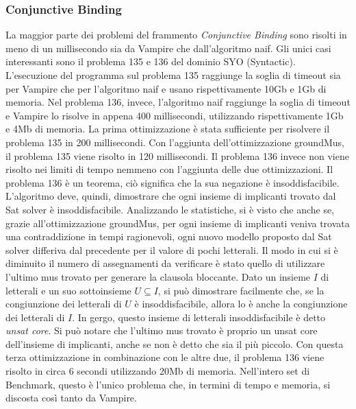 \documentclass[./main.tex]{subfiles}
\begin{document}
\subsubsection{Conjunctive Binding}
La maggior parte dei problemi del frammento \textit{Conjunctive Binding} sono risolti in meno di un millisecondo sia da Vampire che dall'algoritmo naif.
Gli unici casi interessanti sono il problema 135 e 136 del dominio SYO (Syntactic).
L'esecuzione del programma sul problema 135 raggiunge la soglia di timeout sia per Vampire che per l'algoritmo naif 
e usano rispettivamente 10Gb e 1Gb di memoria.
Nel problema 136, invece, l'algoritmo naif raggiunge la soglia di timeout e Vampire lo risolve in appena 400 millisecondi, 
utilizzando rispettivamente 1Gb e 4Mb di memoria.
La prima ottimizzazione è stata sufficiente per risolvere il problema 135 in 200 millisecondi.
Con l'aggiunta dell'ottimizzazione groundMus, il problema 135 viene risolto in 120 millisecondi.
Il problema 136 invece non viene risolto nei limiti di tempo nemmeno con l'aggiunta delle due ottimizzazioni.
Il problema 136 è un teorema, ciò significa che la sua negazione è insoddisfacibile.
L'algoritmo deve, quindi, dimostrare che ogni insieme di implicanti trovato dal Sat solver è insoddisfacibile.
Analizzando le statistiche, si è visto che anche se, grazie all'ottimizzazione groundMus,
per ogni insieme di implicanti veniva trovata una contraddizione in tempi ragionevoli, 
ogni nuovo modello proposto dal Sat solver differiva dal precedente per il valore di pochi letterali.
Il modo in cui si è diminuito il numero di assegnamenti da verificare è stato quello di utilizzare 
l'ultimo mus trovato per generare la clausola bloccante. 
Dato un insieme $I$ di letterali
e un suo sottoinsieme $U \subseteq I$, si può dimostrare facilmente che, se la congiunzione dei letterali
di $U$ è insoddisfacibile, allora lo è anche la congiunzione dei letterali di $I$.
In gergo, questo insieme di letterali insoddisfacibile è detto \textit{unsat core}.
Si può notare che l'ultimo mus trovato è proprio un unsat core dell'insieme di implicanti, anche se non è detto che sia il più piccolo.
Con questa terza ottimizzazione in combinazione con le altre due, il problema 136 viene risolto in circa 6 secondi utilizzando 20Mb di memoria.
Nell'intero set di Benchmark, questo è l'unico problema che, 
in termini di tempo e memoria, si discosta così tanto da Vampire.
\end{document}
